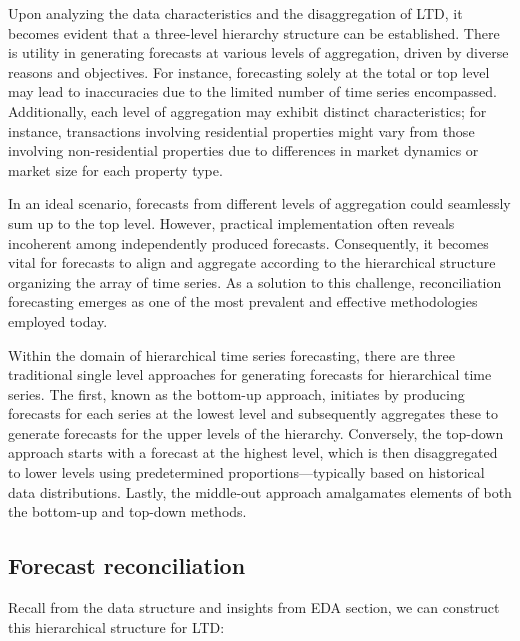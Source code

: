 \documentclass[11pt,a4paper,]{article}
\begin{document}
Upon analyzing the data characteristics and the disaggregation of LTD, it becomes evident that a three-level hierarchy structure can be established. There is utility in generating forecasts at various levels of aggregation, driven by diverse reasons and objectives. For instance, forecasting solely at the total or top level may lead to inaccuracies due to the limited number of time series encompassed. Additionally, each level of aggregation may exhibit distinct characteristics; for instance, transactions involving residential properties might vary from those involving non-residential properties due to differences in market dynamics or market size for each property type.

In an ideal scenario, forecasts from different levels of aggregation could seamlessly sum up to the top level. However, practical implementation often reveals incoherent among independently produced forecasts. Consequently, it becomes vital for forecasts to align and aggregate according to the hierarchical structure organizing the array of time series. As a solution to this challenge, reconciliation forecasting emerges as one of the most prevalent and effective methodologies employed today.

Within the domain of hierarchical time series forecasting, there are three traditional single level approaches for generating forecasts for hierarchical time series. The first, known as the bottom-up approach, initiates by producing forecasts for each series at the lowest level and subsequently aggregates these to generate forecasts for the upper levels of the hierarchy. Conversely, the top-down approach starts with a forecast at the highest level, which is then disaggregated to lower levels using predetermined proportions---typically based on historical data distributions. Lastly, the middle-out approach amalgamates elements of both the bottom-up and top-down methods.

\subsection{Forecast reconciliation}\label{forecast-reconciliation}

Recall from the data structure and insights from EDA section, we can construct this hierarchical structure for LTD:
\end{document}
